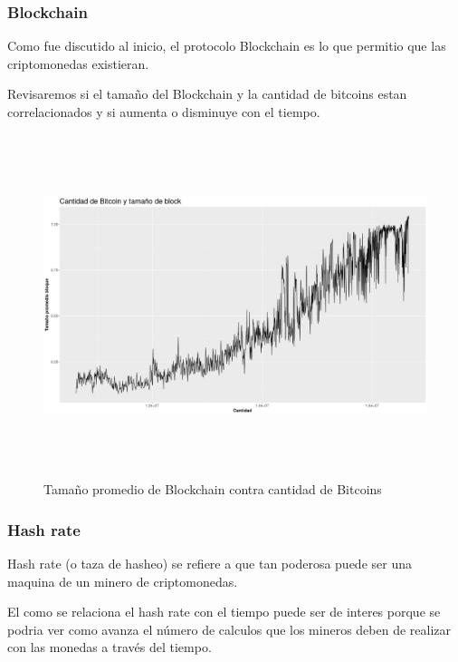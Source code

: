 \documentclass[12pt,letterpaper]{article}
\begin{document}
    \subsubsection*{Blockchain}

    Como fue discutido al inicio, el protocolo Blockchain es lo que permitio que las criptomonedas existieran.

    Revisaremos si el tamaño del Blockchain y la cantidad de bitcoins estan correlacionados y si aumenta o disminuye con el tiempo.

    \begin{figure}
        \centering

        \includegraphics[width = 18cm, height = 10cm]{btc/blockSize_vs_cantidad}

        \caption{Tama\~no promedio de Blockchain contra cantidad de Bitcoins}
    \end{figure}

    \subsubsection*{Hash rate}

    Hash rate (o taza de hasheo) se refiere a que tan poderosa puede ser una maquina de un minero de criptomonedas.

    El como se relaciona el hash rate con el tiempo puede ser de interes porque se podria ver como avanza el número de calculos que los mineros deben de realizar con las monedas a través del tiempo.
\end{document}
